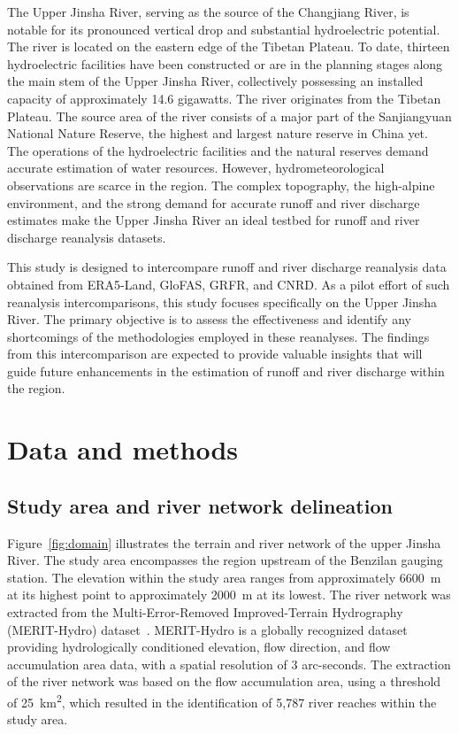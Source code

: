 \documentclass[preprint, review, authoryear, longtitle, 12pt, 3p]{elsarticle}
\begin{document}
The Upper Jinsha River, serving as the source of the Changjiang River, is notable for its pronounced vertical drop and substantial hydroelectric potential. The river is located on the eastern edge of the Tibetan Plateau. To date, thirteen hydroelectric facilities have been constructed or are in the planning stages along the main stem of the Upper Jinsha River, collectively possessing an installed capacity of approximately 14.6 gigawatts. The river originates from the Tibetan Plateau. The source area of the river consists of a major part of the Sanjiangyuan National Nature Reserve, the highest and largest nature reserve in China yet. The operations of the hydroelectric facilities and the natural reserves demand accurate estimation of water resources. However, hydrometeorological observations are scarce in the region. The complex topography, the high-alpine environment, and the strong demand for accurate runoff and river discharge estimates make the Upper Jinsha River an ideal testbed for runoff and river discharge reanalysis datasets.

This study is designed to intercompare runoff and river discharge reanalysis data obtained from ERA5-Land, GloFAS, GRFR, and CNRD. As a pilot effort of such reanalysis intercomparisons, this study focuses specifically on the Upper Jinsha River. The primary objective is to assess the effectiveness and identify any shortcomings of the methodologies employed in these reanalyses. The findings from this intercomparison are expected to provide valuable insights that will guide future enhancements in the estimation of runoff and river discharge within the region.

\section{Data and methods}

\subsection{Study area and river network delineation}

Figure~\ref{fig:domain} illustrates the terrain and river network of the upper Jinsha River. The study area encompasses the region upstream of the Benzilan gauging station. The elevation within the study area ranges from approximately 6600~m at its highest point to approximately 2000~m at its lowest. The river network was extracted from the Multi-Error-Removed Improved-Terrain Hydrography (MERIT-Hydro) dataset~\citep{yamazaki2019WRR, yamazaki2017GRL}. MERIT-Hydro is a globally recognized dataset providing hydrologically conditioned elevation, flow direction, and flow accumulation area data, with a spatial resolution of 3 arc-seconds. The extraction of the river network was based on the flow accumulation area, using a threshold of 25~km\textsuperscript{2}, which resulted in the identification of 5,787 river reaches within the study area.
\end{document}

